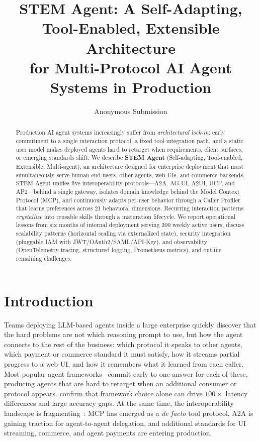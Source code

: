 \documentclass[11pt]{article}
\title{STEM Agent: A Self-Adapting, Tool-Enabled, Extensible Architecture\\
for Multi-Protocol AI Agent Systems in Production}
\author{Anonymous Submission}
\begin{document}
\maketitle

\begin{abstract}
Production AI agent systems increasingly suffer from \emph{architectural lock-in}: early commitment to a single interaction protocol, a fixed tool-integration path, and a static user model makes deployed agents hard to retarget when requirements, client surfaces, or emerging standards shift. We describe \textbf{STEM Agent} (Self-adapting, Tool-enabled, Extensible, Multi-agent), an architecture designed for enterprise deployment that must simultaneously serve human end-users, other agents, web UIs, and commerce backends. STEM Agent unifies five interoperability protocols---A2A, AG-UI, A2UI, UCP, and AP2---behind a single gateway, isolates domain knowledge behind the Model Context Protocol (MCP), and continuously adapts per-user behavior through a Caller Profiler that learns preferences across 21 behavioral dimensions. Recurring interaction patterns \emph{crystallize} into reusable skills through a maturation lifecycle. We report operational lessons from six months of internal deployment serving 200 weekly active users, discuss scalability patterns (horizontal scaling via externalized state), security integration (pluggable IAM with JWT/OAuth2/SAML/API-Key), and observability (OpenTelemetry tracing, structured logging, Prometheus metrics), and outline remaining challenges.
\end{abstract}

\section{Introduction}
\label{sec:intro}

Teams deploying LLM-based agents inside a large enterprise quickly discover that the hard problems are not which reasoning prompt to use, but how the agent connects to the rest of the business: which protocol it speaks to other agents, which payment or commerce standard it must satisfy, how it streams partial progress to a web UI, and how it remembers what it learned from each caller. Most popular agent frameworks~\citep{tran2025multiagent, ferrag2025agents} commit early to one answer for each of these, producing agents that are hard to retarget when an additional consumer or protocol appears. \citet{orogat2026mafbench} confirm that framework choice alone can drive $100\times$ latency differences and large accuracy gaps. At the same time, the interoperability landscape is fragmenting~\citep{ehtesham2025survey, li2025gluetoprotocols}: MCP has emerged as a \emph{de facto} tool protocol, A2A is gaining traction for agent-to-agent delegation, and additional standards for UI streaming, commerce, and agent payments are entering production.
\end{document}
